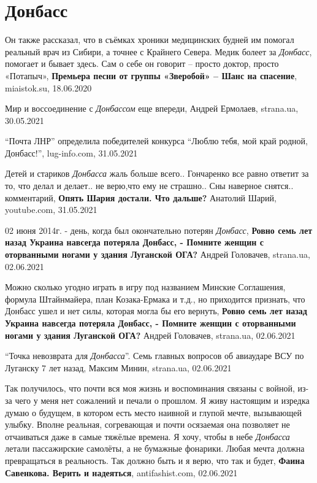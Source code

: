  
 
 
 
 
\chapter{Донбасс}
\label{sec:slova.donbass}

Он также рассказал, что в съёмках хроники медицинских будней им помогал
реальный врач из Сибири, а точнее с Крайнего Севера. Медик болеет за
\emph{Донбасс}, помогает и бывает здесь. Сам о себе он говорит – просто доктор,
просто «Потапыч», \textbf{Премьера песни от группы «Зверобой» – Шанс на
спасение}, miaistok.su, 18.06.2020

Мир и воссоединение с \emph{Донбассом} еще впереди, Андрей Ермолаев, strana.ua,
30.05.2021

\enquote{Почта ЛНР} определила победителей конкурса \enquote{Люблю тебя, мой
край родной, Донбасс!}, lug-info.com, 31.05.2021

Детей и стариков \emph{Донбасса} жаль больше всего.. Гончаренко все равно ответит за
то, что делал и делает.. не верю,что ему не страшно.. Сны наверное снятся..
комментарий, \textbf{Опять Шария достали. Что дальше?} Анатолий Шарий, youtube.com, 31.05.2021

02 июня 2014г. - день, когда был окончательно потерян \emph{Донбасс},
\textbf{Ровно семь лет назад Украина навсегда потеряла Донбасс, - Помните женщин с оторванными ногами у здания Луганской ОГА?} 
Андрей Головачев, strana.ua, 02.06.2021

Можно сколько угодно играть в игру под названием Минские Соглашения, формула
Штайнмайера, план Козака-Ермака и т.д., но приходится признать, что Донбасс
ушел и нет силы, которая могла бы его вернуть,
\textbf{Ровно семь лет назад Украина навсегда потеряла Донбасс, - Помните женщин с оторванными ногами у здания Луганской ОГА?} 
Андрей Головачев, strana.ua, 02.06.2021

\enquote{Точка невозврата для \emph{Донбасса}}. Семь главных вопросов об авиаударе ВСУ по Луганску 7 лет назад,
Максим Минин, strana.ua, 02.06.2021

Так получилось, что почти вся моя жизнь и воспоминания связаны с войной, из-за
чего у меня нет сожалений и печали о прошлом. Я живу настоящим и изредка думаю
о будущем, в котором есть место наивной и глупой мечте, вызывающей улыбку.
Вполне реальная, согревающая и почти осязаемая она позволяет не отчаиваться
даже в самые тяжёлые времена. Я хочу, чтобы в небе \emph{Донбасса} летали пассажирские
самолёты, а не бумажные фонарики. Любая мечта должна превращаться в реальность.
Так должно быть и я верю, что так и будет,
\textbf{Фаина Савенкова. Верить и надеяться}, antifashist.com, 02.06.2021



